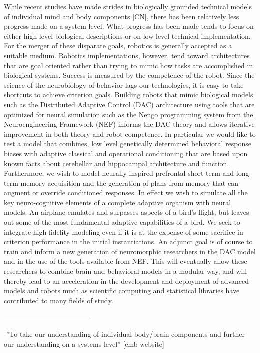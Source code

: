 While recent studies have made strides in biologically grounded technical
models of individual mind and body components {[}CN{]}, there has
been relatively less progress made on a system level. What progress
has been made tends to focus on either high-level biological descriptions
or on low-level technical implementation. For the merger of these
disparate goals, robotics is generally accepted as a suitable medium.
Robotics implementations, however, tend toward architectures that
are goal oriented rather than trying to mimic how tasks are accomplished
in biological systems. Success is measured by the competence of the
robot. Since the science of the neurobiology of behavior lags our
technologies, it is easy to take shortcuts to achieve criterion goals.
Building robots that mimic biological models such as the Distributed
Adaptive Control (DAC) architecture using tools that are optimized
for neural simulation such as the Nengo programming system from the
Neuroengineering Framework (NEF) informs the DAC theory and allows
iterative improvement in both theory and robot competence. In particular
we would like to test a model that combines, low level genetically
determined behavioral response biases with adaptive classical and
operational conditioning that are based upon known facts about cerebellar
and hippocampal architecture and function. Furthermore, we wish to
model neurally inspired prefrontal short term and long term memory
acquisition and the generation of plans from memory that can augment
or override conditioned responses. In effect we wish to simulate all
the key neuro-cognitive elements of a complete adaptive organism with
neural models. An airplane emulates and surpasses aspects of a bird\textquoteright{}s
flight, but leaves out some of the most fundamental adaptive capabilities
of a bird. We seek to integrate high fidelity modeling even if it
is at the expense of some sacrifice in criterion performance in the
initial instantiations. An adjunct goal is of course to train and
inform a new generation of neuromorphic researchers in the DAC model
and in the use of the tools available from NEF. This will eventually
allow these researchers to combine brain and behavioral models in
a modular way, and will thereby lead to an acceleration in the development
and deployment of advanced models and robots much as scientific computing
and statistical libraries have contributed to many fields of study.

-------------------------------------

-\textquotedblright{}To take our understanding of individual body/brain
components and further our understanding on a systems level\textquotedblright{}
{[}emb website{]}

